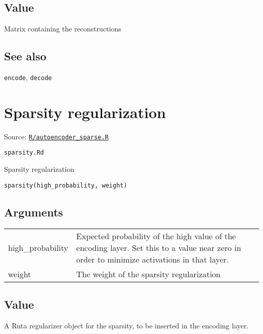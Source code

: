 \hypertarget{value}{\subsection{\texorpdfstring{\protect\hyperlink{value}{}Value}{Value}}\label{value}}

Matrix containing the reconstructions

\hypertarget{see-also}{\subsection{\texorpdfstring{\protect\hyperlink{see-also}{}See
also}{See also}}\label{see-also}}

\texttt{encode}, \texttt{decode}

\section{Sparsity regularization}\label{sparsity-regularization}

Source:
\href{https://github.com/fdavidcl/ruta/blob/master/R/autoencoder_sparse.R}{\texttt{R/autoencoder\_sparse.R}}

\texttt{sparsity.Rd}

Sparsity regularization

\begin{verbatim}
sparsity(high_probability, weight)
\end{verbatim}

\hypertarget{arguments}{\subsection{\texorpdfstring{\protect\hyperlink{arguments}{}Arguments}{Arguments}}\label{arguments}}

\begin{longtable}[c]{@{}ll@{}}
\toprule
high\_probability & Expected probability of the high value of the
encoding layer. Set this to a value near zero in order to minimize
activations in that layer.\tabularnewline
weight & The weight of the sparsity regularization\tabularnewline
\bottomrule
\end{longtable}

\hypertarget{value}{\subsection{\texorpdfstring{\protect\hyperlink{value}{}Value}{Value}}\label{value}}

A Ruta regularizer object for the sparsity, to be inserted in the
encoding layer.

